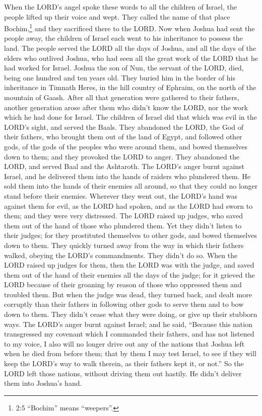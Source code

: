 When the LORD's angel spoke these words to all the children
of Israel, the people lifted up their voice and wept.  They
called the name of that place Bochim,\footnote{2:5 ``Bochim'' means
  ``weepers''.} and they sacrificed there to the LORD.  Now
when Joshua had sent the people away, the children of Israel each went
to his inheritance to possess the land.  The people served
the LORD all the days of Joshua, and all the days of the elders who
outlived Joshua, who had seen all the great work of the LORD that he had
worked for Israel.  Joshua the son of Nun, the servant of
the LORD, died, being one hundred and ten years old.  They
buried him in the border of his inheritance in Timnath Heres, in the
hill country of Ephraim, on the north of the mountain of Gaash.
 After all that generation were gathered to their fathers,
another generation arose after them who didn't know the LORD, nor the
work which he had done for Israel.  The children of Israel
did that which was evil in the LORD's sight, and served the Baals.
 They abandoned the LORD, the God of their fathers, who
brought them out of the land of Egypt, and followed other gods, of the
gods of the peoples who were around them, and bowed themselves down to
them; and they provoked the LORD to anger.  They abandoned
the LORD, and served Baal and the Ashtaroth.  The LORD's
anger burnt against Israel, and he delivered them into the hands of
raiders who plundered them. He sold them into the hands of their enemies
all around, so that they could no longer stand before their enemies.
 Wherever they went out, the LORD's hand was against them
for evil, as the LORD had spoken, and as the LORD had sworn to them; and
they were very distressed.  The LORD raised up judges, who
saved them out of the hand of those who plundered them. 
Yet they didn't listen to their judges; for they prostituted themselves
to other gods, and bowed themselves down to them. They quickly turned
away from the way in which their fathers walked, obeying the LORD's
commandments. They didn't do so.  When the LORD raised up
judges for them, then the LORD was with the judge, and saved them out of
the hand of their enemies all the days of the judge; for it grieved the
LORD because of their groaning by reason of those who oppressed them and
troubled them.  But when the judge was dead, they turned
back, and dealt more corruptly than their fathers in following other
gods to serve them and to bow down to them. They didn't cease what they
were doing, or give up their stubborn ways.  The LORD's
anger burnt against Israel; and he said, ``Because this nation
transgressed my covenant which I commanded their fathers, and has not
listened to my voice,  I also will no longer drive out any
of the nations that Joshua left when he died from before them;
 that by them I may test Israel, to see if they will keep
the LORD's way to walk therein, as their fathers kept it, or not.''
 So the LORD left those nations, without driving them out
hastily. He didn't deliver them into Joshua's hand.

